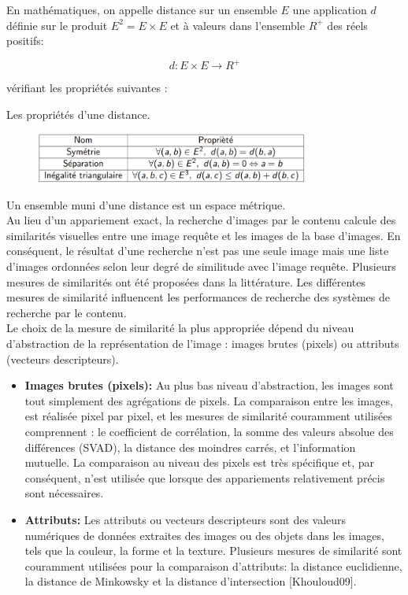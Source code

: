 En mathématiques, on appelle distance sur un ensemble $E$ une application $d$ définie sur le produit $E^2 = E \times E$ et à valeurs dans l'ensemble $R^+$ des réels positifs:

\begin{equation}
	d: E \times E \rightarrow R^+
\end{equation}

vérifiant les propriétés suivantes :
\begin{table}[H]
	\caption{Les propriétés d'une distance.}
\begin{figure}[H]
	\centering
	\includegraphics[width=0.8\textwidth]{Figures/distanceProp.png} %
\end{figure}
\end{table}

Un ensemble muni d'une distance est un espace métrique.\\

Au lieu d'un appariement exact, la recherche d’images par le contenu calcule des similarités visuelles entre une image requête et les images de la base d'images. En conséquent, le résultat d'une recherche n'est pas une seule image mais une liste d'images ordonnées selon leur degré de similitude avec l'image requête. Plusieurs mesures de similarités ont été proposées dans la littérature. Les différentes mesures de similarité influencent les performances de recherche des systèmes de recherche par le contenu.\\

Le choix de la mesure de similarité la plus appropriée dépend du niveau d'abstraction de la
représentation de l'image : images brutes (pixels) ou attributs (vecteurs descripteurs).
\begin{itemize}
	\item \textbf{Images brutes (pixels): }Au plus bas niveau d'abstraction, les images sont tout simplement des agrégations de pixels. La comparaison entre les images, est réalisée pixel par pixel, et les mesures de similarité couramment utilisées comprennent : le coefficient de corrélation, la somme des valeurs absolue des différences (SVAD), la distance des moindres carrés, et l’information mutuelle.
	La comparaison au niveau des pixels est très spécifique et, par conséquent, n'est utilisée que lorsque des appariements relativement précis sont nécessaires.
	
	\item \textbf{Attributs:} Les attributs ou vecteurs descripteurs sont des valeurs numériques de données extraites des images ou des objets dans les images, tels que la couleur, la forme et la texture. Plusieurs mesures de similarité sont couramment utilisées pour la comparaison d’attributs: la distance euclidienne, la distance de Minkowsky et la distance d’intersection  [Khouloud09].
\end{itemize}


